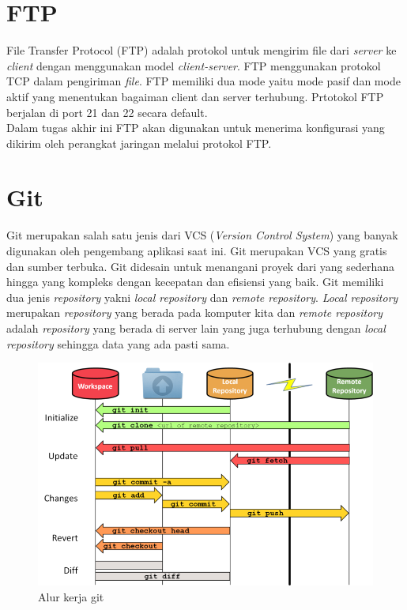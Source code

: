         \section{FTP}
        	File Transfer Protocol (FTP) adalah protokol untuk mengirim file dari \textit{server} ke \textit{client} dengan menggunakan model \textit{client-server}. FTP menggunakan protokol TCP dalam pengiriman \textit{file}. FTP memiliki dua mode yaitu mode pasif dan mode aktif yang menentukan bagaiman client dan server terhubung\cite{ftp}. Prtotokol FTP berjalan di port 21 dan 22 secara default.\\
        	\indent Dalam tugas akhir ini FTP akan digunakan untuk menerima konfigurasi yang dikirim oleh perangkat jaringan melalui protokol FTP.
        	
       	\section{Git}
       		Git merupakan salah satu jenis dari VCS (\textit{Version Control System}) yang banyak digunakan oleh pengembang aplikasi saat ini. Git merupakan VCS yang gratis dan sumber terbuka. Git didesain untuk menangani proyek dari yang sederhana hingga yang kompleks dengan kecepatan dan efisiensi yang baik\cite{git_about}. Git memiliki dua jenis \textit{repository} yakni \textit{local repository} dan \textit{remote repository}. \textit{Local repository} merupakan \textit{repository} yang berada pada komputer kita dan \textit{remote repository} adalah \textit{repository} yang berada di server lain yang juga terhubung dengan \textit{local repository} sehingga data yang ada pasti sama.
       		
       			\begin{figure}[H]
       			\centering
       			\includegraphics[width=\textwidth]{Images/C-2/Git_workflow.png}
       			\caption{Alur kerja git \cite{git_workflow} }
       			\label{GitWorkflow}
       			\end{figure}
       		
